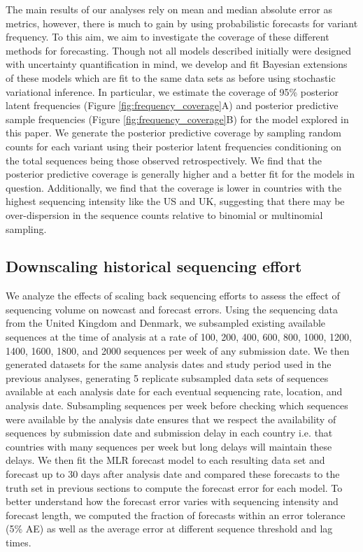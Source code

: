 \documentclass[11pt,oneside,letterpaper]{article}
\begin{document}
The main results of our analyses rely on mean and median absolute error as metrics, however, there is much to gain by using probabilistic forecasts for variant frequency.
To this aim, we aim to investigate the coverage of these different methods for forecasting.
Though not all models described initially were designed with uncertainty quantification in mind, we develop and fit Bayesian extensions of these models which are fit to the same data sets as before using stochastic variational inference.
In particular, we estimate the coverage of 95\% posterior latent frequencies (Figure \ref{fig:frequency_coverage}A) and posterior predictive sample frequencies (Figure \ref{fig:frequency_coverage}B) for the model explored in this paper.
We generate the posterior predictive coverage by sampling random counts for each variant using their posterior latent frequencies conditioning on the total sequences being those observed retrospectively.
We find that the posterior predictive coverage is generally higher and a better fit for the models in question.
Additionally, we find that the coverage is lower in countries with the highest sequencing intensity like the US and UK, suggesting that there may be over-dispersion in the sequence counts relative to binomial or multinomial sampling.

\subsection*{Downscaling historical sequencing effort}

We analyze the effects of scaling back sequencing efforts to assess the effect of sequencing volume on nowcast and forecast errors.
Using the sequencing data from the United Kingdom and Denmark, we subsampled existing available sequences at the time of analysis at a rate of 100, 200, 400, 600, 800, 1000, 1200, 1400, 1600, 1800, and 2000 sequences per week of any submission date.
We then generated datasets for the same analysis dates and study period used in the previous analyses, generating 5 replicate subsampled data sets of sequences available at each analysis date for each eventual sequencing rate, location, and analysis date.
Subsampling sequences per week before checking which sequences were available by the analysis date ensures that we respect the availability of sequences by submission date and submission delay in each country i.e. that countries with many sequences per week but long delays will maintain these delays.
We then fit the MLR forecast model to each resulting data set and forecast up to 30 days after analysis date and compared these forecasts to the truth set in previous sections to compute the forecast error for each model.
To better understand how the forecast error varies with sequencing intensity and forecast length, we computed the fraction of forecasts within an error tolerance (5\% AE) as well as the average error at different sequence threshold and lag times.
\end{document}
